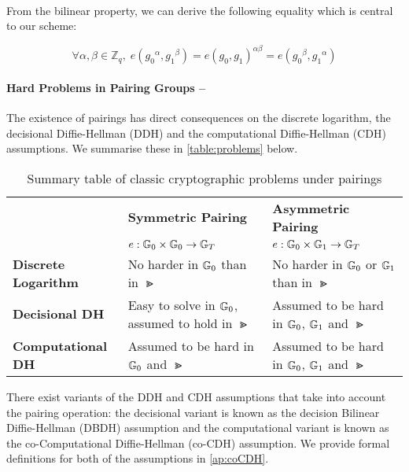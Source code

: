\paragraph{} From the bilinear property, we can derive the following equality which is central to our scheme:

\begin{equation}
	\label{eq:pairing}
	\forall \alpha, \beta \in \mathbb{Z}_q, \; e({g_0}^\alpha, {g_1}^\beta) = e({g_0}, {g_1})^{\alpha\beta} =e({g_0}^\beta, {g_1}^\alpha)
\end{equation}

\paragraph{Hard Problems in Pairing Groups --} The existence of pairings has direct consequences on the discrete logarithm, the decisional Diffie-Hellman (DDH) and the computational Diffie-Hellman (CDH) assumptions. We summarise these in \autoref{table:problems} below.

\begin{table}[H]
	\begin{center}
  		\begin{tabularx}{\linewidth}{l|X|X}
    			& \textbf{Symmetric Pairing} & \textbf{Asymmetric Pairing} \\
    			& $e : \mathbb{G}_0 \times \mathbb{G}_0 \rightarrow \mathbb{G}_T $ & $e : \mathbb{G}_0 \times \mathbb{G}_1 \rightarrow \mathbb{G}_T $\\
    		\hline
    		\textbf{Discrete Logarithm} & No harder in $\mathbb{G}_0$ than in $\Gt$& No harder in $\mathbb{G}_0$ or $\mathbb{G}_1$ than in $\Gt$ \\
    		\hline
    		\textbf{Decisional DH}& Easy to solve in $\mathbb{G}_0$, assumed to hold in $\Gt$& Assumed to be hard in $\mathbb{G}_0$, $\mathbb{G}_1$ and $\Gt$\\
    		\hline
    		\textbf{Computational DH} & Assumed to be hard in $\mathbb{G}_0$ and $\Gt$ & Assumed to be hard in $\mathbb{G}_0$, $\mathbb{G}_1$ and $\Gt$
  		\end{tabularx}
  		\caption{Summary table of classic cryptographic problems under pairings}
  		\label{table:problems}
  \end{center}
\end{table}

\noindent There exist variants of the DDH and CDH assumptions that take into account the pairing operation: the decisional variant is known as the decision Bilinear Diffie-Hellman (DBDH) assumption and the computational variant is known as the co-Computational Diffie-Hellman (co-CDH) assumption. We provide formal definitions for both of the assumptions in \autoref{ap:coCDH}.

